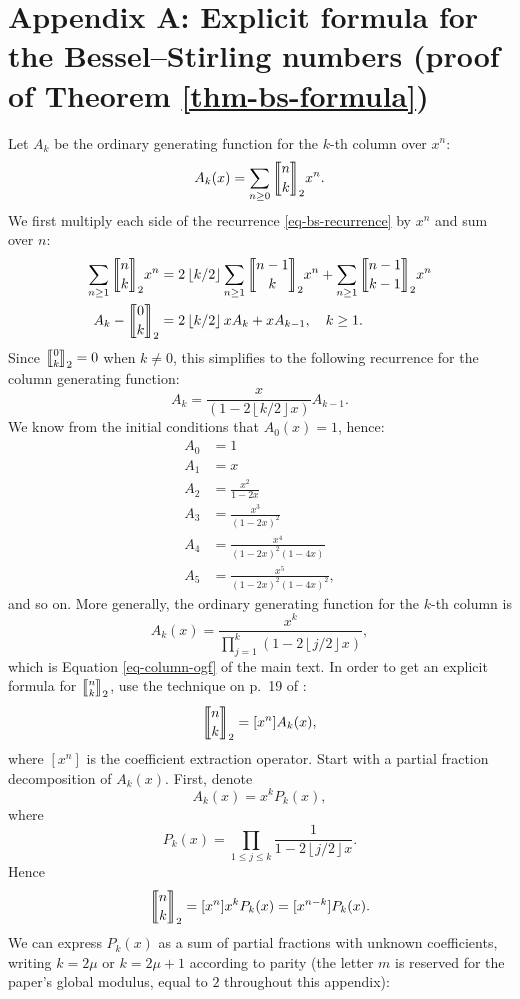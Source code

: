 \documentclass[a4paper]{amsart}
\numberwithin{equation}{section}
\newcommand{\mStirling}[0]{\genfrac{\llbracket}{\rrbracket}{0pt}{}}
\newcommand{\floor}[1]{\left\lfloor #1 \right\rfloor}
\begin{document}
\printbibliography

\pagebreak

\section*{Appendix A: Explicit formula for the Bessel--Stirling numbers (proof of Theorem \ref{thm-bs-formula})}
Let $A_k$ be the ordinary generating function for the $k$-th column over $x^n$:
\[
A_k(x) = \sum_{n\ge0} \mStirling{n}{k}_2 x^n.
\]
We first multiply each side of the recurrence \eqref{eq-bs-recurrence} by $x^n$ and sum over $n$:
\[
\begin{aligned}
\sum_{n \geq 1} \mStirling{n}{k}_2x^n &= 2\floor{k/2}\sum_{n \geq 1}\mStirling{n-1}{k}_2x^n + \sum_{n \geq 1} \mStirling{n-1}{k-1}_2 x^n \\
A_k -\mStirling{0}{k}_2&=2\floor{k/2}x A_k+x A_{k-1}, \quad k \geq 1.
\end{aligned}
\]
Since $\mStirling{0}{k}_2 = 0$ when $k \neq 0$, this simplifies to the following recurrence for the column generating function:
\[
A_k = \frac{x}{(1-2\floor{k/2}x)} A_{k-1}.
\]
We know from the initial conditions that $A_0(x) = 1$, hence:
\[
\begin{aligned}
    A_0 &= 1 \\
    A_1 &= x \\
    A_2 &= \frac{x^2}{1-2x} \\
    A_3 &= \frac{x^3}{(1-2x)^2} \\
    A_4 &= \frac{x^4}{(1-2x)^2 (1-4x)} \\
    A_5 &= \frac{x^5}{(1-2x)^2 (1-4x)^2}, 
\end{aligned}
\]
and so on. More generally, the ordinary generating function for the $k$-th column is
\begin{equation}
A_k(x) = \frac{x^k}{\prod_{j=1}^k(1-2\floor{j/2}x)},
\end{equation}
which is Equation \eqref{eq-column-ogf} of the main text. In order to get an explicit formula for $\mStirling{n}{k}_2$, use the technique on p.~19 of \cite{wilfGeneratingfunctionologyThirdEdition2005}:
\[
\mStirling{n}{k}_2 = [x^n]A_k(x),
\]
where $[x^n]$ is the coefficient extraction operator. Start with a partial fraction decomposition of $A_k(x)$. First, denote
\[
A_k(x) = x^kP_k(x),
\]
where
\[
P_k(x) = \prod_{1 \leq j \leq k}\frac{1}{1-2\floor{j/2}x}.
\]
Hence
\begin{equation}\label{znk-coef}
\mStirling{n}{k}_2 = [x^n]x^kP_k(x) = [x^{n-k}]P_k(x).
\end{equation}
We can express $P_k(x)$ as a sum of partial fractions with unknown coefficients, writing $k = 2\mu$ or $k = 2\mu + 1$ according to parity (the letter $m$ is reserved for the paper's global modulus, equal to $2$ throughout this appendix):
\end{document}
